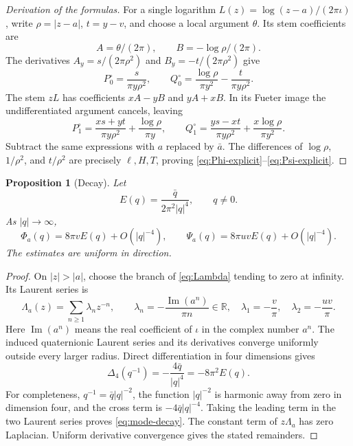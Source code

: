 \documentclass[11pt,a4paper]{article}
\numberwithin{equation}{section}
\newtheorem{proposition}[theorem]{Proposition}
\theoremstyle{definition}
\theoremstyle{remark}
\newcommand{\R}{\mathbb R}
\newcommand{\lap}{\Delta_4}
\newcommand{\Ima}{\operatorname{Im}}
\begin{document}
\begin{proof}[Derivation of the formulas]
For a single logarithm $L(z)=\log(z-a)/(2\pi\iota)$, write
$\rho=|z-a|$, $t=y-v$, and choose a local argument $\theta$.
Its stem coefficients are
\[
 A=\theta/(2\pi),\qquad B=-\log\rho/(2\pi).
\]
The derivatives $A_y=s/(2\pi\rho^2)$ and
$B_y=-t/(2\pi\rho^2)$ give
\[
 P^\circ_0=\frac{s}{\pi y\rho^2},\qquad
 Q^\circ_0=\frac{\log\rho}{\pi y^2}-\frac{t}{\pi y\rho^2}.
\]
The stem $zL$ has coefficients $xA-yB$ and $yA+xB$. In its Fueter
image the undifferentiated argument cancels, leaving
\[
 P^\circ_1=\frac{xs+yt}{\pi y\rho^2}+\frac{\log\rho}{\pi y},\qquad
 Q^\circ_1=\frac{ys-xt}{\pi y\rho^2}+\frac{x\log\rho}{\pi y^2}.
\]
Subtract the same expressions with $a$ replaced by $\bar a$.
The differences of $\log\rho$, $1/\rho^2$, and $t/\rho^2$ are precisely
$\ell,H,T$, proving \eqref{eq:Phi-explicit}--\eqref{eq:Psi-explicit}.
\end{proof}

\begin{proposition}[Decay]\label{prop:decay}
Let
\begin{equation}\label{eq:E}
 E(q)=\frac{\bar q}{2\pi^2|q|^4},\qquad q\ne0.
\end{equation}
As $|q|\to\infty$,
\begin{equation}\label{eq:mode-decay}
 \Phi_a(q)=8\pi v E(q)+O(|q|^{-4}),\qquad
 \Psi_a(q)=8\pi uv E(q)+O(|q|^{-4}).
\end{equation}
The estimates are uniform in direction.
\end{proposition}
\begin{proof}
On $|z|>|a|$, choose the branch of \eqref{eq:Lambda} tending to zero
at infinity. Its Laurent series is
\begin{equation}\label{eq:Lambda-series}
 \Lambda_a(z)=\sum_{n\ge1}\lambda_n z^{-n},\qquad
 \lambda_n=-\frac{\Ima(a^n)}{\pi n}\in\R,
 \quad \lambda_1=-\frac v\pi,\quad\lambda_2=-\frac{uv}\pi.
\end{equation}
Here $\Ima(a^n)$ means the real coefficient of $\iota$ in the complex
number $a^n$. The induced quaternionic Laurent series and its derivatives
converge uniformly outside every larger radius. Direct differentiation
in four dimensions gives
\[
 \lap(q^{-1})=-\frac{4\bar q}{|q|^4}=-8\pi^2E(q).
\]
For completeness, $q^{-1}=\bar q|q|^{-2}$, the function $|q|^{-2}$ is
harmonic away from zero in dimension four, and the cross term is
$-4\bar q|q|^{-4}$. Taking the leading term in the two Laurent series
proves \eqref{eq:mode-decay}. The constant term of $z\Lambda_a$ has
zero Laplacian. Uniform derivative convergence gives the stated remainders.
\end{proof}
\end{document}
